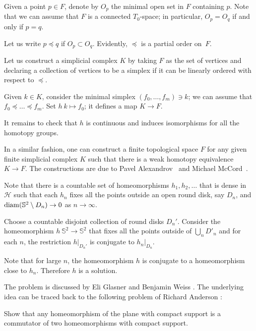   

Given a point $p\in F$,
denote by $O_p$ the minimal open set in $F$ containing $p$. 
Note that we can assume that $F$ is a connected $T_0$-space;
in particular, $O_p=O_q$ if and only if $p=q$.

Let us write $p\preccurlyeq q$ 
if $O_p\subset O_q$.
Evidently, $\preccurlyeq$ is a partial order on~$F$.

Let us construct a simplicial complex $K$ 
by taking $F$ as the set of vertices
and declaring a collection of vertices to be a simplex 
if it can be linearly ordered with respect to $\preccurlyeq$.

Given $k\in K$,
consider the minimal simplex $(f_0,\ldots,f_m)\ni k$;
we can assume that $f_0\preccurlyeq \ldots\preccurlyeq f_m$.
Set $h\:k\mapsto f_0$;
it defines a map $K\to F$.

It remains to check that $h$ is continuous 
and induces isomorphisms for all the homotopy groups.
\qeds

In a similar fashion, one can construct a finite topological space $F$ for any given finite simplicial complex $K$
such that 
there is a weak homotopy equivalence $K\to F$.
The constructions are due to Pavel Alexandrov~\cite{alexandrov-finite} and Michael McCord~\cite{mccord}.

Note that there is a countable set of homeomorphisms $h_1,h_2,\ldots$ that is dense in $\mathcal{H}$
such that each $h_n$ fixes all the points outside an open round disk, say $D_n$,
and $\operatorname{\rm diam}\nolimits (\mathbb{S}^2\setminus D_n)\to0$ as $n\to\infty$.

Choose a countable disjoint collection of round disks $D_n'$.
Consider the homeomorphism $h\:\mathbb S^2\to \mathbb S^2$
that fixes all the points outside of $\bigcup_nD'_n$ and
for each $n$,
the restriction $h|_{D_n'}$ is conjugate to $h_n|_{D_n}$. 


Note that for large $n$, the homeomorphism $h$ is conjugate to a homeomorphism close to $h_n$.
Therefore $h$ is a solution.
\qeds

The problem is discussed by Eli Glasner and Benjamin Weiss \cite{glasner-weiss}.
The underlying idea can be traced back to the following problem of Richard Anderson \cite{anderson1958}:

\begin{pr}
Show that any homeomorphism of the plane with compact support is a commutator of two homeomorphisms with compact support.
\end{pr}

